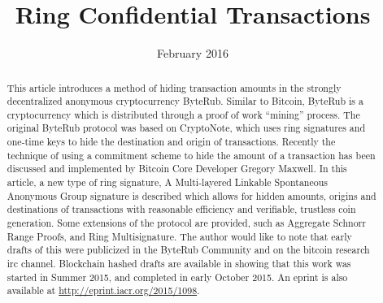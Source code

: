 \documentclass[12pt,english]{mrl}
\theoremstyle{definition}
\numberwithin{equation}{section}
\numberwithin{figure}{section}
\numberwithin{equation}{section}
\numberwithin{equation}{section}
\numberwithin{figure}{section}
\begin{document}
\begin{frontmatter}

\begin{fmbox}
\hfill\setlength{\fboxrule}{0px}\setlength{\fboxsep}{5px}
\title{Ring Confidential Transactions}
\date{February 2016}
\author[
   addressref={mrl},
   email={lab@getbyterub.org   shen.noether@gmx.com}
]{ }
\author[
   addressref={mrl},
   email={lab@getbyterub.org}
]{ }
\author[
   addressref={mrl},
   email={lab@getbyterub.org}
]{}

\address[id=mrl]{
}\end{fmbox}


\begin{abstractbox}
\begin{abstract}
This article introduces a method of hiding transaction amounts in
the strongly decentralized anonymous cryptocurrency ByteRub. Similar
to Bitcoin, ByteRub is a cryptocurrency which is distributed through
a proof of work ``mining'' process. The original ByteRub protocol
was based on CryptoNote, which uses ring signatures and one-time keys
to hide the destination and origin of transactions. Recently the technique
of using a commitment scheme to hide the amount of a transaction has
been discussed and implemented by Bitcoin Core Developer Gregory Maxwell.
In this article, a new type of ring signature, A Multi-layered Linkable
Spontaneous Anonymous Group signature is described which allows for hidden
amounts, origins and destinations of transactions with reasonable
efficiency and verifiable, trustless coin generation. Some extensions of the protocol are provided, such as Aggregate Schnorr Range Proofs, and Ring Multisignature. The author would like to note that early drafts of this were publicized in the ByteRub Community and on the bitcoin research irc channel. Blockchain hashed drafts are available in \cite{Snoe} showing that this work was started in Summer 2015, and completed in early October 2015. An eprint is also available at \url{http://eprint.iacr.org/2015/1098}.
\end{abstract}
\end{abstractbox}

\end{frontmatter}
\end{document}
